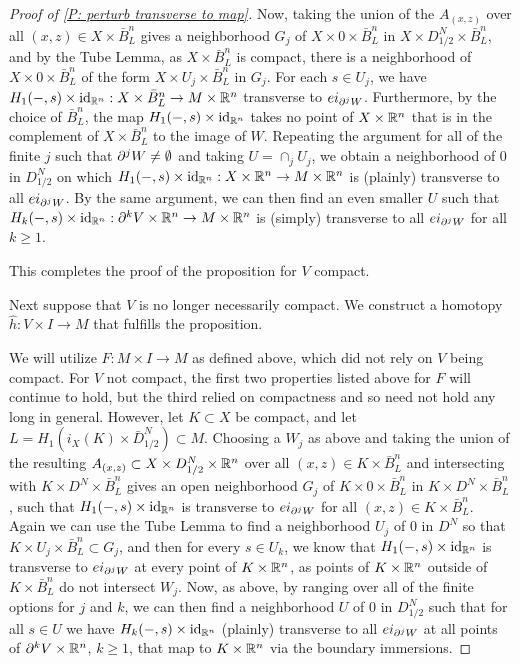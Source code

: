\begin{proof}[Proof of \cref{P: perturb transverse to map}]
Now, taking the union of the $A_{(x,z)}$ over all $(x,z)\in X\times \bar B^n_L$ gives a neighborhood $G_j$ of $X\times 0\times \bar B^n_L$ in $X\times D_{1/2}^N\times \bar B^n_L$, and by the Tube Lemma, as $X\times \bar B^n_L$ is compact, there is a neighborhood of $X\times 0\times \bar B^n_L$ of the form $X\times U_j\times \bar B^n_L$ in $G_j$. For each $s\in U_j$, we have $H_1(-,s)\times \mathrm{id}_{\mathbb{R}^n}:X\times \bar B^n_L\to M\times \mathbb{R}^n$ transverse to $ei_{\partial^jW}$. Furthermore, by the choice of $\bar B^n_L$, the map $H_1(-,s)\times \mathrm{id}_{\mathbb{R}^n}$ takes no point of $X\times \mathbb{R}^n$ that is in the complement of $X\times \bar B^n_L$ to the image of $W$. Repeating the argument for all of the finite $j$ such that $\partial^jW\neq \emptyset$ and taking $U=\cap_j U_j$, we obtain a neighborhood of $0$ in $D_{1/2}^N$ on which  $H_1(-,s)\times \mathrm{id}_{\mathbb{R}^n}:X\times \mathbb{R}^n\to M\times \mathbb{R}^n$ is (plainly) transverse to all $ei_{\partial^jW}$. By the same argument,  we can then find an even smaller $U$ such that $H_k(-,s)\times \mathrm{id}_{\mathbb{R}^n}:\partial^{k}V\times \mathbb{R}^n\to M\times \mathbb{R}^n$ is (simply) transverse to all $ei_{\partial^jW}$ for all $k\geq 1$.


This completes the proof of the proposition for $V$ compact.


Next suppose that $V$ is no longer necessarily compact. We construct a homotopy $\hat h:V\times I\to M$ that fulfills the proposition.




We will utilize $F:M\times I\to M$ as defined above, which did not rely on $V$ being compact. For $V$ not compact, the first two properties listed above for $F$ will continue to hold, but the third relied on compactness and so need not hold any long in general.
However, let  $K\subset X$ be compact, and let $L=H_1(i_X(K)\times \bar D_{1/2}^N)\subset M$.
Choosing a $W_j$ as above and taking the union of the resulting $A_{(x,z)}\subset X\times D_{1/2}^N\times \mathbb{R}^n$ over all $(x,z)\in K\times \bar B^n_L$ and intersecting with $K\times D^N\times \bar B^n_L$ gives an open neighborhood $G_j$ of $K\times 0\times \bar B^n_L$ in $K\times D^N\times \bar B^n_L$, such that
 $H_1(-,s)\times \mathrm{id}_{\mathbb{R}^n}$ is transverse to $ei_{\partial^jW}$  for all $(x,z)\in K\times \bar B^n_L$. Again we can use the Tube Lemma to find a neighborhood $U_j$ of $0$ in $D^N$ so that $K\times U_j\times \bar B^n_L \subset G_j$, and then for every $s\in U_k$, we know that $H_1(-,s)\times \mathrm{id}_{\mathbb{R}^n}$ is transverse to $ei_{\partial^jW}$ at every point of $K\times \mathbb{R}^n$, as points of $K\times \mathbb{R}^n$ outside of $K\times \bar B^n_L$ do not intersect $W_j$.  Now, as above, by ranging over all of the finite options for $j$ and $k$,  we can then find a neighborhood $U$ of $0$ in $D^N_{1/2}$ such that for all $s\in U$ we have $H_k(-,s)\times \mathrm{id}_{\mathbb{R}^n}$  (plainly) transverse to all $ei_{\partial^jW}$ at all points of $\partial^kV\times \mathbb{R}^n$, $k\geq 1$, that map to $K\times \mathbb{R}^n$ via the boundary immersions.


\end{proof}
